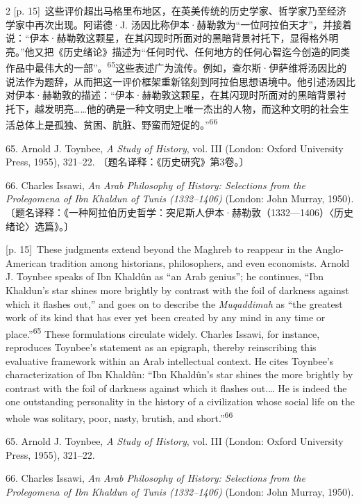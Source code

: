 \documentclass[10pt,a4paper]{article}
\begin{document}
\begin{paracol}{2}
{\scriptsize\color{gray} [p. 15]}\ 这些评价超出马格里布地区，在英美传统的历史学家、哲学家乃至经济学家中再次出现。阿诺德·J. 汤因比称伊本·赫勒敦为“一位阿拉伯天才”，并接着说：“伊本·赫勒敦这颗星，在其闪现时所面对的黑暗背景衬托下，显得格外明亮。”他又把《历史绪论》描述为“任何时代、任何地方的任何心智迄今创造的同类作品中最伟大的一部”。\nobreak\textsuperscript{65}这些表述广为流传。例如，查尔斯·伊萨维将汤因比的说法作为题辞，从而把这一评价框架重新铭刻到阿拉伯思想语境中。他引述汤因比对伊本·赫勒敦的描述：“伊本·赫勒敦这颗星，在其闪现时所面对的黑暗背景衬托下，越发明亮……他的确是一种文明史上唯一杰出的人物，而这种文明的社会生活总体上是孤独、贫困、肮脏、野蛮而短促的。”\nobreak\textsuperscript{66}\par{\small 65. Arnold J. Toynbee, \textit{A Study of History}, vol. III (London: Oxford University Press, 1955), 321–22. 〔题名译释：《历史研究》第3卷。〕\par}{\small 66. Charles Issawi, \textit{An Arab Philosophy of History: Selections from the Prolegomena of Ibn Khaldun of Tunis (1332–1406)} (London: John Murray, 1950). 〔题名译释：《一种阿拉伯历史哲学：突尼斯人伊本·赫勒敦（1332—1406）〈历史绪论〉选篇》。〕\par}
\switchcolumn
{\scriptsize\color{gray} [p. 15]}\ These judgments extend beyond the Maghreb to reappear in the Anglo-American tradition among historians, philosophers, and even economists. Arnold J. Toynbee speaks of Ibn Khaldûn as “an Arab genius”; he continues, “Ibn Khaldun’s star shines more brightly by contrast with the foil of darkness against which it flashes out,” and goes on to describe the \textit{Muqaddimah} as “the greatest work of its kind that has ever yet been created by any mind in any time or place.”\nobreak\textsuperscript{65} These formulations circulate widely. Charles Issawi, for instance, reproduces Toynbee’s statement as an epigraph, thereby reinscribing this evaluative framework within an Arab intellectual context. He cites Toynbee’s characterization of Ibn Khaldûn: “Ibn Khaldûn’s star shines the more brightly by contrast with the foil of darkness against which it flashes out.… He is indeed the one outstanding personality in the history of a civilization whose social life on the whole was solitary, poor, nasty, brutish, and short.”\nobreak\textsuperscript{66}\par{\small 65. Arnold J. Toynbee, \textit{A Study of History}, vol. III (London: Oxford University Press, 1955), 321–22.\par}{\small 66. Charles Issawi, \textit{An Arab Philosophy of History: Selections from the Prolegomena of Ibn Khaldun of Tunis (1332–1406)} (London: John Murray, 1950).\par}

\end{paracol}
\end{document}
